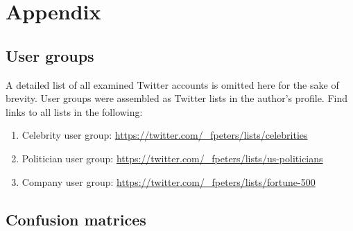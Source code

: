 %
%
%
%
%

\appendix

\section{Appendix}
\label{ch:appendix}

\subsection{User groups}
\label{sec:user_groups}

A detailed list of all examined Twitter accounts is omitted here for the sake
of brevity.
User groups were assembled as Twitter lists in the author's profile.
Find links to all lists in the following:

\begin{enumerate}
\item Celebrity user group: \url{https://twitter.com/_fpeters/lists/celebrities}
\item Politician user group: \url{https://twitter.com/_fpeters/lists/us-politicians}
\item Company user group: \url{https://twitter.com/_fpeters/lists/fortune-500}
\end{enumerate}


\subsection{Confusion matrices}
\label{sec:confusion_matrices}


